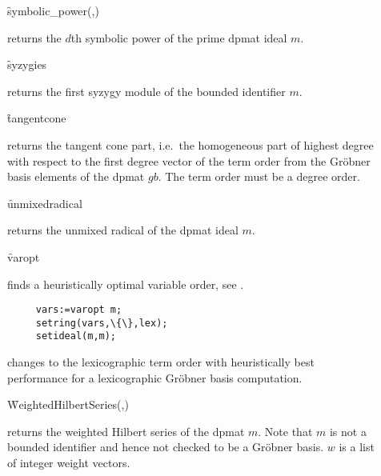 \begin{description}
\item[]
  \begin{syntax}
    \f{symbolic\_power}(,)
  \end{syntax}
  \hypertarget{operator:SYMBOLIC_POWER}{}
returns the $d$th symbolic power of the prime dpmat ideal $m$.

\item[]
  \begin{syntax}
    \f{syzygies} 
  \end{syntax}
  \hypertarget{operator:SYZYGIES}{}
returns the first syzygy module of the bounded identifier $m$.

\item[]
  \begin{syntax}
    \f{tangentcone} 
  \end{syntax}
  \hypertarget{operator:TANGENTCONE}{}
returns the tangent cone part, i.e.\ the homogeneous part of
highest degree with respect to the first degree vector of the term
order from the Gr\"obner basis elements of the dpmat $gb$. The term order
must be a degree order.

\item[]
  \begin{syntax}
    \f{unmixedradical} 
  \end{syntax}
  \hypertarget{operator:UNMIXEDRADICAL}{}
returns the unmixed radical of the dpmat ideal $m$.

\item[]
  \begin{syntax}
    \f{varopt} 
  \end{syntax}
  \hypertarget{operator:VAROPT}{}
  finds a heuristically optimal variable order, see \cite{Boege:86}.
\begin{verbatim}
     vars:=varopt m;
     setring(vars,\{\},lex);
     setideal(m,m);
\end{verbatim}
changes to the lexicographic term order with heuristically best
performance for a lexicographic Gr\"obner basis computation.

\item[]
  \begin{syntax}
    \f{WeightedHilbertSeries}(,)
  \end{syntax}
  \hypertarget{operator:WEIGHTEDHILBERTSERIES}{}
returns the weighted Hilbert series of the dpmat $m$. Note that
$m$ is not a bounded identifier and hence not checked to be a Gr\"obner
basis. $w$ is a list of integer weight vectors.


\end{description}
